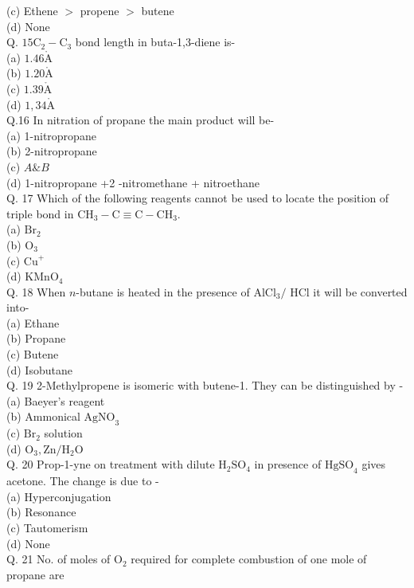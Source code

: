 \documentclass[10pt]{article}
\def\AA{\mathring{\mathrm{A}}}
\begin{document}
(c) Ethene $>$ propene $>$ butene\\
(d) None\\
Q. $15 \mathrm{C}_{2}-\mathrm{C}_{3}$ bond length in buta-1,3-diene is-\\
(a) $1.46 \AA$\\
(b) $1.20 \AA$\\
(c) $1.39 \AA$\\
(d) $1,34 \AA$\\
Q.16 In nitration of propane the main product will be-\\
(a) 1-nitropropane\\
(b) 2-nitropropane\\
(c) $A \& B$\\
(d) 1-nitropropane +2 -nitromethane + nitroethane\\
Q. 17 Which of the following reagents cannot be used to locate the position of triple bond in $\mathrm{CH}_{3}-\mathrm{C} \equiv \mathrm{C}-\mathrm{CH}_{3}$.\\
(a) $\mathrm{Br}_{2}$\\
(b) $\mathrm{O}_{3}$\\
(c) $\mathrm{Cu}^{+}$\\
(d) $\mathrm{KMnO}_{4}$\\
Q. 18 When $n$-butane is heated in the presence of $\mathrm{AlCl}_{3} /$ HCl it will be converted into-\\
(a) Ethane\\
(b) Propane\\
(c) Butene\\
(d) Isobutane\\
Q. 19 2-Methylpropene is isomeric with butene-1. They can be distinguished by -\\
(a) Baeyer's reagent\\
(b) Ammonical $\mathrm{AgNO}_{3}$\\
(c) $\mathrm{Br}_{2}$ solution\\
(d) $\mathrm{O}_{3}, \mathrm{Zn} / \mathrm{H}_{2} \mathrm{O}$\\
Q. 20 Prop-1-yne on treatment with dilute $\mathrm{H}_{2} \mathrm{SO}_{4}$ in presence of $\mathrm{HgSO}_{4}$ gives acetone. The change is due to -\\
(a) Hyperconjugation\\
(b) Resonance\\
(c) Tautomerism\\
(d) None\\
Q. 21 No. of moles of $\mathrm{O}_{2}$ required for complete combustion of one mole of propane are\\
\end{document}
